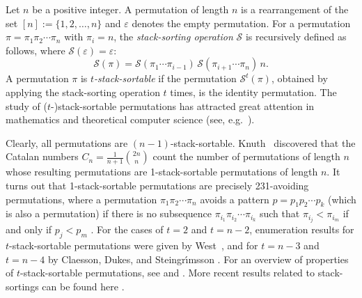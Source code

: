 \documentclass[11pt]{article}
\newcommand{\+}{\mbox{\ensuremath{\scriptstyle{+}}}}
\begin{document}

Let $n$ be  a positive integer. A permutation of length $n$ is a rearrangement of the set $[n]:=\{1,2,\ldots,n\}$ and $\varepsilon$ denotes the empty permutation.
For a permutation $\pi=\pi_1\pi_2\cdots \pi_n$ with $\pi_i=n$,  the {\em stack-sorting operation} $\mathcal{S}$  is recursively defined as follows, where $\mathcal{S}(\varepsilon) =\varepsilon$:
$$\mathcal{S}(\pi) = \mathcal{S}(\pi_1\cdots \pi_{i-1})\,  \mathcal{S}(\pi_{i+1}\cdots \pi_n)\, n.$$
A permutation $\pi$ is {\em $t$-stack-sortable} if the permutation $\mathcal{S}^t(\pi)$, obtained by applying the stack-sorting operation $t$ times,  is the identity permutation. The study of ($t$-)stack-sortable permutations has  attracted great attention in mathematics and theoretical computer science (see, e.g.\ \cite{BBS2010,Bona2002Symmetry,BKLPRW,Cerbai2021,Cerbai2020Stack,Claesson2010Permutations,Defant2021Asymptotics,Defant2021Stack,Zhang2015real}).

Clearly, all permutations are $(n-1)$-stack-sortable. Knuth~\cite{Knuth1969Art} discovered that  the Catalan numbers $C_n=\frac{1}{n+1}\binom{2n}{n}$ count the number of permutations of length $n$ whose resulting permutations  are 1-stack-sortable permutations of length $n$. It turns out that 1-stack-sortable permutations are precisely  231-avoiding permutations, where a permutation $\pi_1\pi_2\cdots\pi_n$ avoids a pattern $p=p_1p_2\cdots p_k$ (which is also a permutation) if there is no subsequence $\pi_{i_1}\pi_{i_2}\cdots\pi_{i_k}$ such that $\pi_{i_j}<\pi_{i_m}$ if and only if $p_j<p_m$ \cite{Kitaev2011Patterns}. For the cases of $t=2$ and $t=n-2$, enumeration results for $t$-stack-sortable permutations were given by West~\cite{West1990Permutations},
and  for $t=n-3$ and $t=n-4$ by
Claesson,  Dukes, and Steingr\'\i msson \cite{Claesson2010Permutations}.
For an overview of properties of $t$-stack-sortable permutations,
see \cite{Bona2002Symmetry,Knuth1969Art,West1990Permutations} and \cite[Sec 2.1]{Kitaev2011Patterns}. More recent results related to stack-sortings can be found here \cite{BKLPRW,Cerbai2020Stack,Defant2022Troupes, Defant2021Asymptotics,  Defant2021Stack}.
\end{document}
